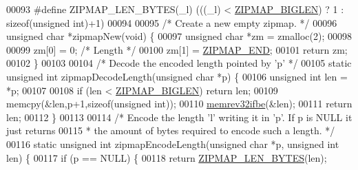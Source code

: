 \begin{DoxyCode}
00093 \textcolor{preprocessor}{#}\textcolor{preprocessor}{define} \textcolor{preprocessor}{ZIPMAP\_LEN\_BYTES}\textcolor{preprocessor}{(}\textcolor{preprocessor}{\_l}\textcolor{preprocessor}{)} \textcolor{preprocessor}{(}\textcolor{preprocessor}{(}\textcolor{preprocessor}{(}\textcolor{preprocessor}{\_l}\textcolor{preprocessor}{)} \textcolor{preprocessor}{<} \hyperlink{zipmap_8c_a1173592dbfaa84c6b2419d0a699c97f5}{ZIPMAP\_BIGLEN}\textcolor{preprocessor}{)} \textcolor{preprocessor}{?} 1 \textcolor{preprocessor}{:} \textcolor{keyword}{sizeof}\textcolor{preprocessor}{(}\textcolor{keywordtype}{unsigned} \textcolor{keywordtype}{int}\textcolor{preprocessor}{)}\textcolor{preprocessor}{+}1\textcolor{preprocessor}{)}
00094 
00095 \textcolor{comment}{/* Create a new empty zipmap. */}
00096 \textcolor{keywordtype}{unsigned} \textcolor{keywordtype}{char} *zipmapNew(\textcolor{keywordtype}{void}) \{
00097     \textcolor{keywordtype}{unsigned} \textcolor{keywordtype}{char} *zm = zmalloc(2);
00098 
00099     zm[0] = 0; \textcolor{comment}{/* Length */}
00100     zm[1] = \hyperlink{zipmap_8c_a7074100d2ecc0c8971936a4edc208782}{ZIPMAP\_END};
00101     \textcolor{keywordflow}{return} zm;
00102 \}
00103 
00104 \textcolor{comment}{/* Decode the encoded length pointed by 'p' */}
00105 \textcolor{keyword}{static} \textcolor{keywordtype}{unsigned} \textcolor{keywordtype}{int} zipmapDecodeLength(\textcolor{keywordtype}{unsigned} \textcolor{keywordtype}{char} *p) \{
00106     \textcolor{keywordtype}{unsigned} \textcolor{keywordtype}{int} len = *p;
00107 
00108     \textcolor{keywordflow}{if} (len < \hyperlink{zipmap_8c_a1173592dbfaa84c6b2419d0a699c97f5}{ZIPMAP\_BIGLEN}) \textcolor{keywordflow}{return} len;
00109     memcpy(&len,p+1,\textcolor{keyword}{sizeof}(\textcolor{keywordtype}{unsigned} \textcolor{keywordtype}{int}));
00110     \hyperlink{endianconv_8h_a771f3656eb7d11a1e7f7294b657d8978}{memrev32ifbe}(&len);
00111     \textcolor{keywordflow}{return} len;
00112 \}
00113 
00114 \textcolor{comment}{/* Encode the length 'l' writing it in 'p'. If p is NULL it just returns}
00115 \textcolor{comment}{ * the amount of bytes required to encode such a length. */}
00116 \textcolor{keyword}{static} \textcolor{keywordtype}{unsigned} \textcolor{keywordtype}{int} zipmapEncodeLength(\textcolor{keywordtype}{unsigned} \textcolor{keywordtype}{char} *p, \textcolor{keywordtype}{unsigned} \textcolor{keywordtype}{int} len) \{
00117     \textcolor{keywordflow}{if} (p == NULL) \{
00118         \textcolor{keywordflow}{return} \hyperlink{zipmap_8c_a3e2d7a4d7208d88fc1b254a2da9bec13}{ZIPMAP\_LEN\_BYTES}(len);

\end{DoxyCode}

